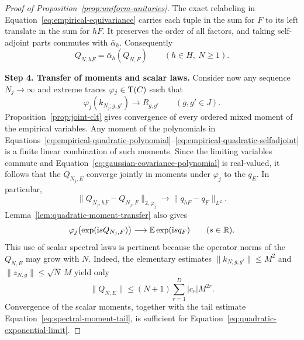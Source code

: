 \begin{proof}[Proof of Proposition~\ref{prop:uniform-unitaries}]
The exact relabeling in Equation~\eqref{eq:empirical-equivariance} carries
each tuple in the sum for \(F\) to its left translate in the sum
for \(hF\). It preserves the order of
all factors, and taking self-adjoint parts commutes with
\(\bar\alpha_h\). Consequently
\begin{equation}\label{eq:quadratic-exact-equivariance}
 Q_{N,hF}=\bar\alpha_h(Q_{N,F})
 \qquad(h\in H,\ N\geq1).
\end{equation}

\textbf{Step 4. Transfer of moments and scalar laws.}
Consider now any sequence \(N_j\to\infty\) and extreme traces
\(\varphi_j\in\operatorname{T}(C)\) such that
\[
 \varphi_j(k_{N_j;g,g'})\longrightarrow R_{g,g'}
 \qquad(g,g'\in J).
\]
Proposition~\ref{prop:joint-clt} gives convergence of every
ordered mixed moment of the empirical variables. Any moment of
the polynomials in
Equations~\eqref{eq:empirical-quadratic-polynomial}--\eqref{eq:empirical-quadratic-selfadjoint}
is a finite linear combination of such moments. Since the
limiting variables commute and
Equation~\eqref{eq:gaussian-covariance-polynomial} is real-valued, it
follows that the \(Q_{N_j,E}\) converge jointly in moments under
\(\varphi_j\) to the \(q_E\). In particular,
\begin{equation}\label{eq:quadratic-difference-limit}
 \|Q_{N_j,hF}-Q_{N_j,F}\|_{2,\varphi_j}
 \longrightarrow \|q_{hF}-q_F\|_{L^2}.
\end{equation}
Lemma~\ref{lem:quadratic-moment-transfer} also gives
\begin{equation}\label{eq:quadratic-exponential-limit}
 \varphi_j\bigl(\exp(\mathrm{i} s Q_{N_j,F})\bigr)
 \longrightarrow\mathbb E\exp(\mathrm{i} s q_F)
 \qquad(s\in\mathbb R).
\end{equation}
This use of scalar spectral laws is pertinent because the
operator norms of the \(Q_{N,E}\) may grow with \(N\).
Indeed, the elementary estimates
\(\|k_{N;g,g'}\|\leq M^2\) and
\(\|z_{N,g}\|\leq\sqrt N\,M\) yield only
\[
 \|Q_{N,E}\|\leq(N+1)\sum_{r=1}^{D}|c_r|M^{2r}.
\]
Convergence of the scalar moments, together with the tail
estimate Equation~\eqref{eq:spectral-moment-tail}, is sufficient for
Equation~\eqref{eq:quadratic-exponential-limit}.


\end{proof}
